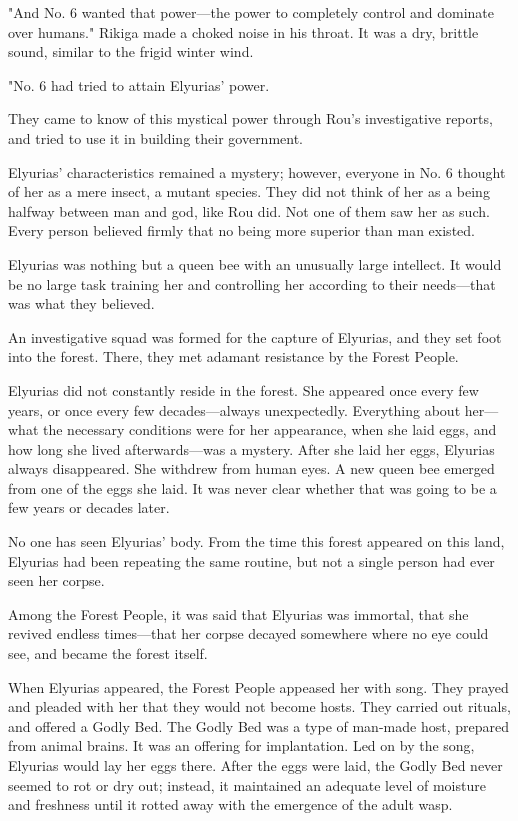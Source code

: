 "\el And No. 6 wanted that power---the power to completely control and
dominate over humans." Rikiga made a choked noise in his throat. It was
a dry, brittle sound, similar to the frigid winter wind.

"No. 6 had tried to attain Elyurias' power.

They came to know of this mystical power through Rou's investigative
reports, and tried to use it in building their government.

Elyurias' characteristics remained a mystery; however, everyone in No. 6
thought of her as a mere insect, a mutant species. They did not think of
her as a being halfway between man and god, like Rou did. Not one of
them saw her as such. Every person believed firmly that no being more
superior than man existed.

Elyurias was nothing but a queen bee with an unusually large intellect.
It would be no large task training her and controlling her according to
their needs---that was what they believed.

An investigative squad was formed for the capture of Elyurias, and they
set foot into the forest. There, they met adamant resistance by the
Forest People.

Elyurias did not constantly reside in the forest. She appeared once
every few years, or once every few decades---always unexpectedly.
Everything about her---what the necessary conditions were for her
appearance, when she laid eggs, and how long she lived afterwards---was a
mystery. After she laid her eggs, Elyurias always disappeared. She
withdrew from human eyes. A new queen bee emerged from one of the eggs
she laid. It was never clear whether that was going to be a few years or
decades later.

No one has seen Elyurias' body. From the time this forest appeared on
this land, Elyurias had been repeating the same routine, but not a
single person had ever seen her corpse.

Among the Forest People, it was said that Elyurias was immortal, that
she revived endless times---that her corpse decayed somewhere where no eye
could see, and became the forest itself.

When Elyurias appeared, the Forest People appeased her with song. They
prayed and pleaded with her that they would not become hosts. They
carried out rituals, and offered a Godly Bed. The Godly Bed was a type
of man-made host, prepared from animal brains. It was an offering for
implantation. Led on by the song, Elyurias would lay her eggs there.
After the eggs were laid, the Godly Bed never seemed to rot or dry out;
instead, it maintained an adequate level of moisture and freshness until
it rotted away with the emergence of the adult wasp.

